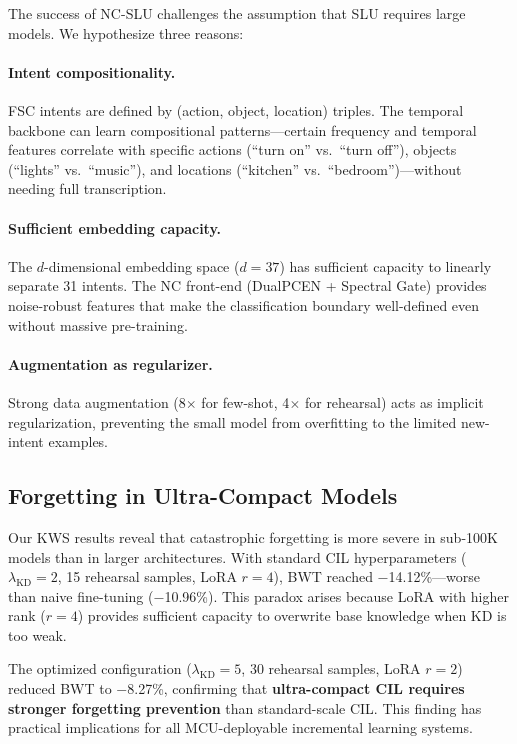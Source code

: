 \documentclass[11pt]{article}
\begin{document}
The success of NC-SLU challenges the assumption that SLU requires large models.
We hypothesize three reasons:

\paragraph{Intent compositionality.}
FSC intents are defined by (action, object, location) triples.
The temporal backbone can learn compositional patterns---certain frequency and temporal features correlate with specific actions (``turn on'' vs.\ ``turn off''), objects (``lights'' vs.\ ``music''), and locations (``kitchen'' vs.\ ``bedroom'')---without needing full transcription.

\paragraph{Sufficient embedding capacity.}
The $d$-dimensional embedding space ($d{=}37$) has sufficient capacity to linearly separate 31 intents.
The NC front-end (DualPCEN + Spectral Gate) provides noise-robust features that make the classification boundary well-defined even without massive pre-training.

\paragraph{Augmentation as regularizer.}
Strong data augmentation (8$\times$ for few-shot, 4$\times$ for rehearsal) acts as implicit regularization, preventing the small model from overfitting to the limited new-intent examples.

\subsection{Forgetting in Ultra-Compact Models}

Our KWS results reveal that catastrophic forgetting is more severe in sub-100K models than in larger architectures.
With standard CIL hyperparameters ($\lambda_{\text{KD}}{=}2$, 15 rehearsal samples, LoRA $r{=}4$), BWT reached $-$14.12\%---worse than naive fine-tuning ($-$10.96\%).
This paradox arises because LoRA with higher rank ($r{=}4$) provides sufficient capacity to overwrite base knowledge when KD is too weak.

The optimized configuration ($\lambda_{\text{KD}}{=}5$, 30 rehearsal samples, LoRA $r{=}2$) reduced BWT to $-$8.27\%, confirming that \textbf{ultra-compact CIL requires stronger forgetting prevention} than standard-scale CIL.
This finding has practical implications for all MCU-deployable incremental learning systems.
\end{document}
